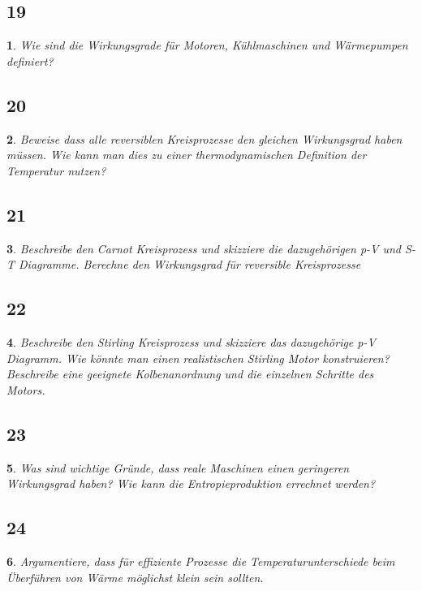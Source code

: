 \documentclass[12pt,a4paper]{report}
\newtheorem{myfrag}{}%
\begin{document}
\subsection{19}
\begin{myfrag}
Wie sind die Wirkungsgrade für Motoren, Kühlmaschinen und Wärmepumpen
definiert?
\end{myfrag}
\subsection{20}
\begin{myfrag}
Beweise dass alle reversiblen Kreisprozesse den gleichen Wirkungsgrad haben
müssen. Wie kann man dies zu einer thermodynamischen Definition der
Temperatur nutzen?
\end{myfrag}
\subsection{21}
\begin{myfrag}
Beschreibe den Carnot Kreisprozess und skizziere die dazugehörigen p-V und S-T
Diagramme. Berechne den Wirkungsgrad für reversible Kreisprozesse
\end{myfrag}
\subsection{22}
\begin{myfrag}
Beschreibe den Stirling Kreisprozess und skizziere das dazugehörige p-V
Diagramm. Wie könnte man einen realistischen Stirling Motor konstruieren?
Beschreibe eine geeignete Kolbenanordnung und die einzelnen Schritte des
Motors.
\end{myfrag}
\subsection{23}
\begin{myfrag}
Was sind wichtige Gründe, dass reale Maschinen einen geringeren Wirkungsgrad
haben? Wie kann die Entropieproduktion errechnet werden?
\end{myfrag}
\subsection{24}
\begin{myfrag}
Argumentiere, dass für effiziente Prozesse die Temperaturunterschiede beim
Überführen von Wärme möglichst klein sein sollten.
\end{myfrag}
\end{document}
